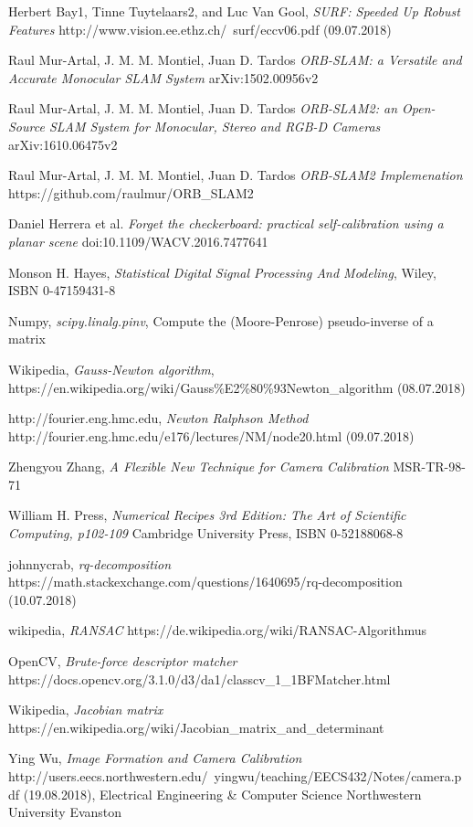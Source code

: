 \documentclass[11pt,a4paper,titlepage,oneside]{report}
\begin{document}
\listoffigures
 
\begin{thebibliography}{1}

  Herbert Bay1, Tinne Tuytelaars2, and Luc Van Gool,
  \textit{SURF: Speeded Up Robust Features}
  http://www.vision.ee.ethz.ch/~surf/eccv06.pdf (09.07.2018)

  Raul Mur-Artal, J. M. M. Montiel, Juan D. Tardos
  \textit{ORB-SLAM: a Versatile and Accurate Monocular SLAM System}
  arXiv:1502.00956v2

  Raul Mur-Artal, J. M. M. Montiel, Juan D. Tardos
  \textit{ORB-SLAM2: an Open-Source SLAM System for Monocular, Stereo and RGB-D Cameras}
	arXiv:1610.06475v2 

  Raul Mur-Artal, J. M. M. Montiel, Juan D. Tardos
  \textit{ORB-SLAM2 Implemenation}
	https://github.com/raulmur/ORB\_SLAM2


  Daniel Herrera et al.
  \textit{Forget the checkerboard: practical self-calibration using a planar scene}
  doi:10.1109/WACV.2016.7477641

  Monson H. Hayes,
  \textit{Statistical Digital Signal Processing And Modeling},
  Wiley, ISBN 0-47159431-8

  Numpy,
  \textit{scipy.linalg.pinv},
  Compute the (Moore-Penrose) pseudo-inverse of a matrix

  Wikipedia,
  \textit{Gauss-Newton algorithm},
  https://en.wikipedia.org/wiki/Gauss\%E2\%80\%93Newton\_algorithm (08.07.2018)

  http://fourier.eng.hmc.edu,
  \textit{Newton Ralphson Method}
  http://fourier.eng.hmc.edu/e176/lectures/NM/node20.html (09.07.2018)

  Zhengyou Zhang,
  \textit{A Flexible New Technique for Camera Calibration}
  MSR-TR-98-71

	William H. Press,
	\textit{Numerical Recipes 3rd Edition: The Art of Scientific Computing, p102-109} 
	Cambridge University Press, ISBN 0-52188068-8

	johnnycrab,
	\textit{rq-decomposition} 
	https://math.stackexchange.com/questions/1640695/rq-decomposition (10.07.2018)

	wikipedia,
	\textit{RANSAC}
	https://de.wikipedia.org/wiki/RANSAC-Algorithmus

	OpenCV,
	\textit{Brute-force descriptor matcher}
	https://docs.opencv.org/3.1.0/d3/da1/classcv\_1\_1BFMatcher.html

	Wikipedia,
	\textit{Jacobian matrix}
	https://en.wikipedia.org/wiki/Jacobian\_matrix\_and\_determinant

	Ying Wu,
	\textit{Image Formation and Camera Calibration}
	http://users.eecs.northwestern.edu/~yingwu/teaching/EECS432/Notes/camera.pdf (19.08.2018), Electrical Engineering \& Computer Science Northwestern University Evanston

\end{thebibliography}
\end{document}
